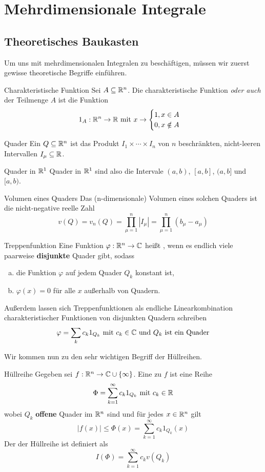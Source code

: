 \newpage
\section[Einführung in die Gebietsintegrale]{Mehrdimensionale Integrale}
\subsection{Theoretisches Baukasten}
Um uns mit mehrdimensionalen Integralen zu beschäftigen, müssen wir zuerst gewisse theoretische Begriffe einführen.
\begin{Def}{Charakteristische Funktion}
Sei $A\subseteq \mathbb{R}^n$. Die charakteristische Funktion \textit{oder auch}  der Teilmenge $A$ ist die Funktion
$$1_A:\mathbb{R}^n \rightarrow \mathbb{R} \mbox{ mit } x\rightarrow \begin{cases}1, x\in A \\
0, x\notin A\end{cases}$$
\end{Def}
\begin{Def}{Quader}
Ein  $Q\subseteq \mathbb{R}^n$ ist das Produkt $I_1\times \cdots \times I_n$ von $n$ beschränkten, nicht-leeren Intervallen $I_\mu \subseteq \mathbb{R}$.
\end{Def}
\begin{Beispiel}{Quader in $\mathbb{R}^1$}
Quader in $\mathbb{R}^1$ sind also die Intervale $(a,b)$, $[a,b]$, $(a,b]$ und $[a,b)$. \\
\end{Beispiel}
\begin{Def}{Volumen eines Quaders}
Das (n-dimensionale) Volumen eines solchen Quaders ist die nicht-negative reelle Zahl
$$v(Q)=v_n(Q)=\prod_{\mu = 1}^n |I_\mu|=\prod_{\mu = 1}^n (b_\mu - a_\mu)$$
\end{Def}
\begin{Def}{Treppenfunktion}
Eine Funktion $\varphi:\mathbb{R}^n \rightarrow \mathbb{C}$ heißt , wenn es endlich viele paarweise \textbf{disjunkte} Quader gibt, sodass
\begin{enumerate}[a)]
    \item die Funktion $\varphi$ auf jedem Quader $Q_k$ konstant ist,
    \item $\varphi(x)=0$ für alle $x$ außerhalb von Quadern.
    \end{enumerate}
Außerdem lassen sich Treppenfunktionen als endliche Linearkombination charakteristischer Funktionen von disjunkten Quadern schreiben
$$\varphi=\sum_{k}c_k 1_{Q_k} \mbox{ mit $c_k\in \mathbb{C}$ und $Q_k$ ist ein Quader}$$ 
\end{Def}
Wir kommen nun zu den sehr wichtigen Begriff der Hüllreihen.
\begin{Def}{Hüllreihe}
Gegeben sei $f:\mathbb{R}^n\rightarrow\mathbb{C}\cup \{\infty\}$. Eine  zu $f$ ist eine Reihe
$$\Phi=\sum_{k=1}^\infty c_k1_{Q_k} \mbox{ mit $c_k\in \mathbb{R}$}$$
wobei $Q_k$ \textbf{offene} Quader im $\mathbb{R}^n$ sind und für jedes $x\in\mathbb{R}^n$ gilt
$$|f(x)|\leq \Phi(x) = \sum_{k=1}^\infty c_k1_{Q_k}(x)$$
Der  der Hüllreihe ist definiert als
$$I(\Phi) = \sum_{k=1}^\infty c_k v(Q_k)$$
\end{Def}

